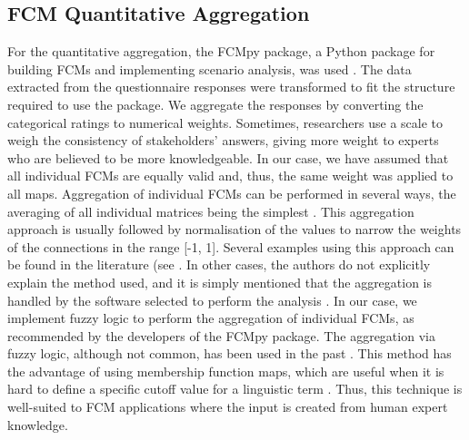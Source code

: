 \clearpage


\subsection{FCM Quantitative Aggregation}
\label{quantitativeAgg}

For the quantitative aggregation, the FCMpy package, a Python package for building FCMs and implementing scenario analysis, was used \citep{mkhitaryan2022fcmpy}. The data extracted from the questionnaire responses were transformed to fit the structure required to use the package. We aggregate the responses by converting the categorical ratings to numerical weights. Sometimes, researchers use a scale to weigh the consistency of stakeholders' answers, giving more weight to experts who are believed to be more knowledgeable. In our case, we have assumed that all individual FCMs are equally valid and, thus, the same weight was applied to all maps. Aggregation of individual FCMs can be performed in several ways, the averaging of all individual matrices being the simplest \citep{jetter2014fuzzy}. This aggregation approach is usually followed by normalisation of the values to narrow the weights of the connections in the range [-1, 1]. Several examples using this approach can be found in the literature (see \citep{lopolito2020combined, morone2021using, morone2019promote}. In other cases, the authors do not explicitly explain the method used, and it is simply mentioned that the aggregation is handled by the software selected to perform the analysis \cite{konti2022determinants, kokkinos2020circular, falcone2020use}. In our case, we implement fuzzy logic to perform the aggregation of individual FCMs, as recommended by the developers of the FCMpy package. The aggregation via fuzzy logic, although not common, has been used in the past \citep{nasirzadeh2020modelling, amini2022combined}. This method has the advantage of using membership function maps, which are useful when it is hard to define a specific cutoff value for a linguistic term \citep{wang2015study}. Thus, this technique is well-suited to FCM applications where the input is created from human expert knowledge. 

